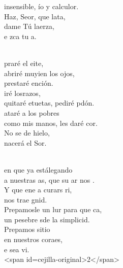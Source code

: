 \begin{cancion}
	insensible, ío y calculor.\\
	Haz, Seor, que lata, \\
	dame Tú laerza,\\
	e zca tu a.\\\jump\\
	\begin{chorus}%
	praré el eite, \\
	abriré muyien los ojos, \\
	prestaré ención.\\
	iré losrazos, \\
	quitaré etuetas, pediré pdón.\\
	ataré a los pobres \\
	como mis manos, les daré cor.\\
	No se de hielo,  \\
	nacerá el Sor.\\
	\end{chorus}%
	\jump\\
	en que ya estálegando  \\
	a nuestras as, que su ar nos .\\
	Y que ene a curars  ri, \\
	nos trae gnid.\\
	Prepamosle un lur para que ca,  \\
	un pesebre sde la simplicid.\\
	Prepamos sitio \\
	en nuestros coraes,\\
	e sea vi.\\
<span id=cejilla-original>2</span>\\
\end{cancion}%
